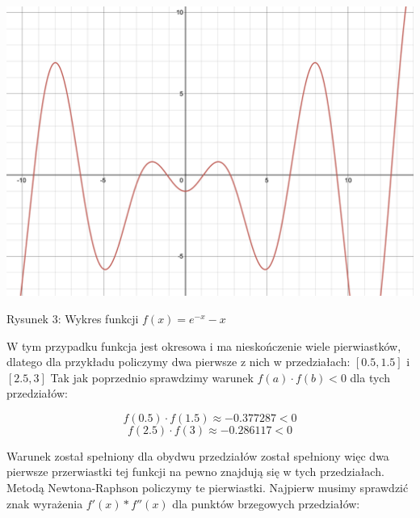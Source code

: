 \documentclass[5]{article}
\begin{document}
\begin{center}
    \includegraphics[scale=0.3]{lab5_31.png} \par
    \vspace{2mm}
    
\end{center}

\hfil{Rysunek 3: Wykres funkcji $f(x) = e^{-x} - x$} \par

    


\vspace{3mm}

W tym przypadku funkcja jest okresowa i ma nieskończenie wiele pierwiastków, dlatego dla przykładu policzymy dwa pierwsze z nich w przedziałach: $[0.5, 1.5]$ i  $[2.5, 3]$
\vspace{3mm}
Tak jak poprzednio sprawdzimy warunek $f(a) \cdot f(b)<0$ dla tych przedziałów: 

$$f(0.5) \cdot f(1.5) \approx-0.377287<0$$
$$f(2.5) \cdot f(3) \approx-0.286117<0$$

Warunek został spełniony dla obydwu przedziałów został spełniony więc dwa pierwsze przerwiastki tej funkcji na pewno znajdują się w tych przedziałach. Metodą Newtona-Raphson policzymy te pierwiastki. Najpierw musimy sprawdzić znak wyrażenia $f'(x)*f''(x)$ dla punktów brzegowych przedziałów: 
\end{document}
